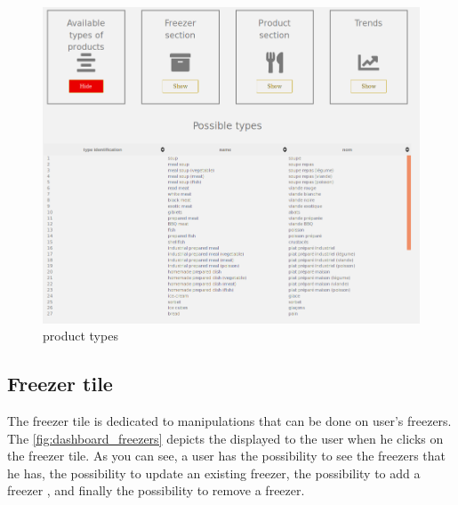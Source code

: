 \begin{figure}[H]
\centering
\includegraphics[scale=0.30]{./images/dashboard_types.png}
\caption{product types}
\label{fig:dashboard_types}
\end{figure}

\subsection{Freezer tile}
The freezer tile is dedicated to manipulations that can be done on user's freezers. The \autoref{fig:dashboard_freezers} depicts the displayed to the user when he clicks on the freezer tile. As you can see, a user has the possibility to see the freezers that he has, the possibility to update an existing freezer, the possibility to add a freezer , and finally the possibility to remove a freezer.

